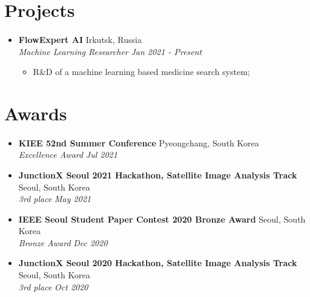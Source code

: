 \documentclass[10pt]{article}
\begin{document}

\section{Projects}
\paragraph{}

\begin{itemize}[noitemsep,topsep=0pt]
    \item \normalsize{\textbf{FlowExpert AI}} \normalsize{\hfill Irkutsk, Russia 
    \\    \textit{ Machine Learning Researcher }
                                                                \hfill \textit{Jan 2021 - Present}}
            \begin{itemize}[itemsep=1pt,topsep=4pt] \normalsize
                \item {R\&D of a machine learning based medicine search system;}
            \end{itemize}

        \end{itemize}


\section{ Awards }
\paragraph{}

\begin{itemize}[itemsep=4pt,topsep=0pt]
    \item \normalsize{\textbf{KIEE 52nd Summer Conference}} \normalsize{\hfill Pyeongchang, South Korea 
    \\    \textit{Excellence Award} \hfill \textit{Jul 2021}}
    \item \normalsize{\textbf{JunctionX Seoul 2021 Hackathon, Satellite Image Analysis Track}} \normalsize{\hfill Seoul, South Korea
    \\    \textit{3rd place} \hfill \textit{May 2021}}
    \item \normalsize{\textbf{IEEE Seoul Student Paper Contest 2020 Bronze Award}} \normalsize{\hfill Seoul, South Korea
    \\    \textit{Bronze Award} \hfill \textit{Dec 2020}}
    \item \normalsize{\textbf{JunctionX Seoul 2020 Hackathon, Satellite Image Analysis Track}} \normalsize{\hfill Seoul, South Korea
    \\    \textit{3rd place} \hfill \textit{Oct 2020}}
        \end{itemize}
\end{document}
